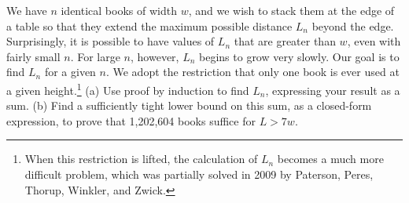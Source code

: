 We have $n$ identical books of width $w$, and we wish to stack them at the edge of a
table so that they extend the maximum possible distance $L_n$ beyond the edge.
Surprisingly, it is possible to have values of $L_n$ that are greater than
$w$, even with fairly small $n$. For large $n$, however, $L_n$ begins
to grow very slowly.
Our goal is to find $L_n$ for a given $n$.
We adopt the restriction that only one book is ever used at a given 
height.\footnote{When this restriction is lifted, the calculation of $L_n$ becomes
a much more difficult problem, which was partially solved in 2009 by Paterson, Peres, Thorup, Winkler, and Zwick.}
(a) Use proof by induction to find $L_n$, expressing your result as a sum.
(b) Find a sufficiently tight lower bound on this sum, as a closed-form
expression, to prove that 1,202,604 books suffice for $L>7w$.
